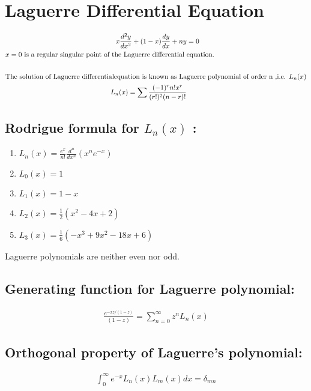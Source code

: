 \section{Laguerre Differential Equation}
\begin{align*}
x \frac{d^{2} y}{d x^{2}}+(1-x) \frac{d y}{d x}+n y&=0\\
\text{$x=0$ is a regular singular point of the Laguerre differential }& \text{equation.}\\\\
\intertext{The solution of Laguerre differentialequation is known as Laguerre polynomial of order n ,i.e. $L_{n}(x)$}
L_{n}(x)=\sum \frac{(-1)^{r} n ! x^{r}}{(r !)^{2}(n-r) !}&
\end{align*}
\subsection{Rodrigue formula for $L_{n}(x)$ :}
\begin{enumerate}
	\item $L_{n}(x)=\frac{e^{x}}{n !} \frac{d^{n}}{d x^{n}}\left(x^{n} e^{-x}\right)$ 
	\item $ L_{0}(x)=1 $ 
	\item $L_{1}(x)=1-x$
	\item $L_{2}(x)=\frac{1}{2}\left(x^{2}-4 x+2\right)$
    \item $L_{3}(x)=\frac{1}{6}\left(-x^{3}+9 x^{2}-18 x+6\right)$
\end{enumerate}
{Laguerre polynomials are neither even nor odd.}


\subsection{Generating function for Laguerre polynomial:}
\begin{align*}
\frac{e^{-x z /(1-z)}}{(1-z)}=\sum_{n=0}^{\infty} z^{n} L_{n}(x)
\end{align*}
\subsection{Orthogonal property of Laguerre's polynomial:}
\begin{align*}
\int_{0}^{\infty} e^{-x} L_{n}(x) L_{m}(x) d x=\delta_{m n}
\end{align*}



